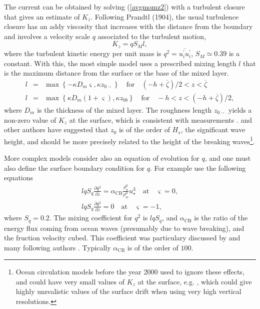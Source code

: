 The current can be obtained by solving  (\ref{avgmomz2}) with a turbulent closure that gives an estimate of  $K_z$. 
Following Prandtl (1904), the usual turbulence closure has an addy viscosity that increases with the distance from the boundary 
\citep{Schlichting1979} and involves a velocity scale $q$ associated to the turbulent motion, 
\begin{equation}
K_z = q S_M l,
\end{equation}
where the turbulent kinetic energy per unit mass is  $q^2 = \overline{u^\prime_i u^\prime_i}$, $S_M \simeq 0.39$ is a constant. 
With this, the  most simple model uses a prescribed mixing length $l$ that is the maximum distance from the surface or the base of the mixed layer. 
\begin{eqnarray}
l &= &\max\left\{-\kappa D_m \varsigma, \kappa  z_{0-}\right\} \quad
\textrm{for}
\quad (-h+\overline{\zeta})/2 < z < \overline{\zeta} \nonumber\\
l &= &\max\left\{\kappa D_m (1+\varsigma), \kappa z_{0b}\right\} \quad
\textrm{for} \quad   -h < z  <(-h+\overline{\zeta})/2 ,
\end{eqnarray}
where $D_m$ is the thickness of the mixed layer. The roughness length  $z_{0-}$ yields a non-zero value of  $K_z$ at the surface, 
  which is consistent with measurements \citep[e.g.][]{Kitaigorodskii1994}. \cite{Thorpe&al.2003a} 
  and other authors have suggested that $z_0$ is of the order of  $H_s$, the significant wave height, and should be more precisely related to the height of the breaking waves\footnote{Ocean circulation models before the year 2000 
  used to ignore these effects, and could have very small values of $K_z$ at the surface, e.g. \citet{Large&al.1994}, 
which could give highly unrealistic values of the surface drift when using very high vertical resolutions.}. 

More complex models consider also an equation of evolution for $q$,  and one must also define the surface boundary
condition for $q$. For example  \cite{Mellor&Yamada1982} use the following equations
\begin{eqnarray}
l q S_q \frac{\partial q^2}{\partial z}  =  \alpha_{\mathrm{CB}} \frac{\rho_a^0}{\rho_w^0}
u_\star^3  \quad \textrm{at} \quad \varsigma =
0, \label{surfq} \\
l q S_q \frac{\partial q^2}{\partial z}  =0 \quad \textrm{at} \quad \varsigma =
-1,
\end{eqnarray}
where $S_q=0.2$. The mixing coefficient for $q^2$ is  $l q S_q$, and 
$\alpha_{\mathrm{CB}}$ is the ratio of the energy flux coming from ocean waves (presumably due to wave breaking), and the fruction velocity cubed. 
This coefficient was particulary discussed by \cite{Craig&Banner1994} and many following authors 
\citep{Terray&al.2000,Mellor&Blumberg2004,Rascle&Ardhuin2009,Rascle&Ardhuin2013}. 
Typically $\alpha_{\mathrm{CB}}$ is of the order of  $100$.

